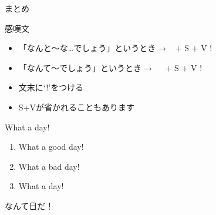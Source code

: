 \documentclass[aspectratio=169,xcolor={dvipsnames,table}]{beamer}
\begin{document}
\begin{frame}[plain]{まとめ}
 
\begin{block}{感嘆文}
\pause
\begin{itemize}[square]\small
 \item \noindent{}「なんと～な\ldots{}でしょう」というとき$\longrightarrow$\,\,\,%
 $+$ S $+$ V !
 \item \noindent{}「なんて～でしょう」というとき$\longrightarrow$\,\,\,%
\,\,\,$+$ S $+$ V !
 \item   文末に`!'をつける
 \item S$+$Vが省かれることもあります

\end{itemize}
     \end{block}
\end{frame}

\begin{frame}[plain]{What a day!}
\begin{enumerate}\large
 \item What a good day!
 \item What a bad day!
 \item What a day!
\end{enumerate}
\pause\vfill
 \Huge\centering
なんて日だ！
\end{frame}
\end{document}
